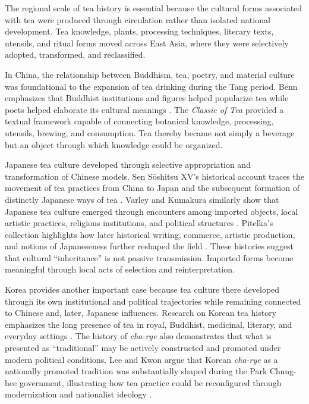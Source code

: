 \documentclass[numbers]{IntechOpen-Book}
\begin{document}
The regional scale of tea history is essential because the cultural forms associated with tea were produced through circulation rather than isolated national development. Tea knowledge, plants, processing techniques, literary texts, utensils, and ritual forms moved across East Asia, where they were selectively adopted, transformed, and reclassified.

In China, the relationship between Buddhism, tea, poetry, and material culture was foundational to the expansion of tea drinking during the Tang period. Benn emphasizes that Buddhist institutions and figures helped popularize tea while poets helped elaborate its cultural meanings \cite{benn2015book,benn2015poetry}. The \textit{Classic of Tea} provided a textual framework capable of connecting botanical knowledge, processing, utensils, brewing, and consumption. Tea thereby became not simply a beverage but an object through which knowledge could be organized.

Japanese tea culture developed through selective appropriation and transformation of Chinese models. Sen Sōshitsu XV's historical account traces the movement of tea practices from China to Japan and the subsequent formation of distinctly Japanese ways of tea \cite{soshitsu1998}. Varley and Kumakura similarly show that Japanese tea culture emerged through encounters among imported objects, local artistic practices, religious institutions, and political structures \cite{varleykumakura1989}. Pitelka's collection highlights how later historical writing, commerce, artistic production, and notions of Japaneseness further reshaped the field \cite{pitelka2013}. These histories suggest that cultural ``inheritance'' is not passive transmission. Imported forms become meaningful through local acts of selection and reinterpretation.

Korea provides another important case because tea culture there developed through its own institutional and political trajectories while remaining connected to Chinese and, later, Japanese influences. Research on Korean tea history emphasizes the long presence of tea in royal, Buddhist, medicinal, literary, and everyday settings \cite{leeandkwon2022}. The history of \textit{cha-rye} also demonstrates that what is presented as ``traditional'' may be actively constructed and promoted under modern political conditions. Lee and Kwon argue that Korean \textit{cha-rye} as a nationally promoted tradition was substantially shaped during the Park Chung-hee government, illustrating how tea practice could be reconfigured through modernization and nationalist ideology \cite{leeandkwon2022}.
\end{document}
